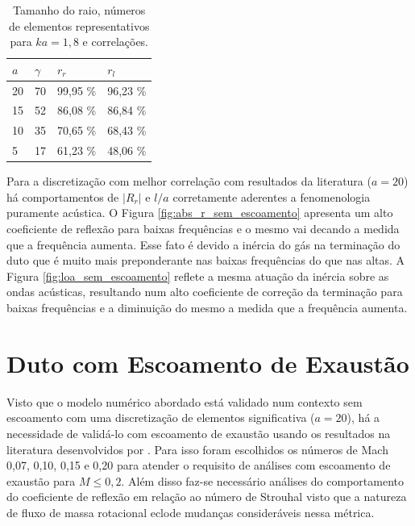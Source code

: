 \begin{table}[ht!]
\centering
\caption{Tamanho do raio, números de elementos representativos para $ka = 1,8$ e correlações.}
\label{table:discretizacao}
    \begin{tabular}{|l|l|l|l|}
        \hline
        $a$ & $\gamma$ & $r_r$ & $r_l$ \\ \hline
        20  & 70 & 99,95 \%  & 96,23 \%  \\ \hline
        15  & 52 &  86,08 \% & 86,84 \% \\ \hline
        10  & 35 &  70,65 \% & 68,43 \% \\ \hline
        5   & 17 &  61,23 \% & 48,06 \%  \\
        \hline
    \end{tabular}
\end{table}

Para a discretização com melhor correlação com resultados da literatura ($a = 20$) há comportamentos de $|R_{r}|$ e $l/a$ corretamente aderentes a fenomenologia puramente acústica. O Figura \ref{fig:abs_r_sem_escoamento} apresenta um alto coeficiente de reflexão para baixas frequências e o mesmo vai decando a medida que a frequência aumenta. Esse fato é devido a inércia do gás na terminação do duto que é muito mais preponderante nas baixas frequências do que nas altas. A Figura \ref{fig:loa_sem_escoamento} reflete a mesma atuação da inércia sobre as ondas acústicas, resultando num alto coeficiente de correção da terminação para baixas frequências e a diminuição do mesmo a medida que a frequência aumenta.       



















\section{Duto com Escoamento de Exaustão}

Visto que o modelo numérico abordado está validado num contexto sem escoamento com uma discretização de elementos significativa ($a = 20$), há a necessidade de validá-lo com escoamento de exaustão usando os resultados na literatura desenvolvidos por . Para isso foram escolhidos os números de Mach 0,07, 0,10, 0,15 e 0,20 para atender o requisito de  análises com escoamento de exaustão para $M \leq 0,2$. Além disso faz-se necessário análises do comportamento do coeficiente de reflexão em relação ao número de Strouhal visto que a natureza de fluxo de massa rotacional eclode mudanças consideráveis nessa métrica.       

